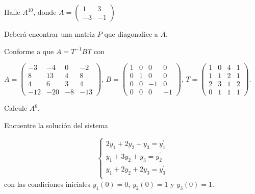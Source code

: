 \bigskip

\bigskip

\begin{exercise} 
 \item 
 
 Halle $A^{10}$, donde 
 $A=\left(\begin{array}{cc}1 & 3 \\-3 & -1
\end{array}
 \right)$

 \bigskip
 
 Deberá encontrar una matriz $P$ que diagonalice a $A$.

\end{exercise} 
\begin{exercise} 
\item 

Conforme a que $A=T^{-1}BT$ con

\bigskip


$A=\left(\begin{array}{cccc}-3 & -4 & 0  &-2\\8  & 13 & 4
& 8\\ 4  & 6 & 3 & 4  \\ -12& -20& -8& -13                       
\end{array}
 \right)$, \quad $B=\left(\begin{array}{cccc}1 & 0 & 0  &0\\0  & 1 & 0
& 0\\ 0  & 0 & -1 & 0  \\ 0& 0& 0& -1                       
\end{array}
 \right)$, \quad $T=\left(\begin{array}{cccc}1 & 0 & 4  &1\\1  & 1 & 2
& 1\\ 2  & 3 & 1 & 2  \\ 0& 1& 1& 1                       
\end{array}
 \right)$.

 \bigskip
 
 
 Calcule $A^{6}$.

\end{exercise} 
\begin{exercise} 
 \item
 
 Encuentre la solución del sistema 
 
 \[
\left\{
\begin{array}{lll}
2y_1 + 2y_2 + y_3 = y^{\prime}_1 \\
y_1 + 3y_2 + y_3= y^{\prime}_2\\
y_1 + 2y_2 + 2y_3= y^{\prime}_3\\
\end{array}
\right.
\]
\noindent
con las condiciones iniciales $y_1(0)=0$, $y_2(0)=1$ y $y_3(0)=1$.
\end{exercise} 

